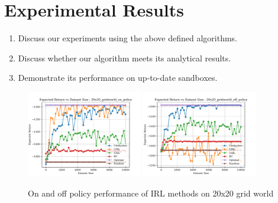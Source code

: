 \documentclass[11pt]{uai2023}
\begin{document}
\section{Experimental Results}
\begin{enumerate}
	\item Discuss our experiments using the above defined algorithms.
	\item Discuss whether our algorithm meets its analytical results.
	\item Demonstrate its performance on up-to-date sandboxes.
\end{enumerate}

\begin{figure}[htbp]
	\centering
	\includegraphics[width=0.45\textwidth]{../src/plots/returns/20x20_gridworld_on_policy_returns.pdf}
	\includegraphics[width=0.45\textwidth]{../src/plots/returns/20x20_gridworld_off_policy_returns.pdf}
	\caption{On and off policy performance of IRL methods on 20x20 grid world}
	\label{fig:off_policy_vs_on_20}
\end{figure}
\end{document}
